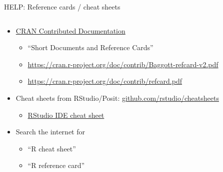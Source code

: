 \documentclass[
  11pt,
  ignorenonframetext,
]{beamer}
\providecommand{\tightlist}{%
  \setlength{\itemsep}{0pt}\setlength{\parskip}{0pt}}
\begin{document}
\begin{frame}{HELP: Reference cards / cheat sheets}
\protect\hypertarget{help-reference-cards-cheat-sheets}{}
\begin{columns}[c,onlytextwidth]
\begin{column}{0.55\textwidth}
\begin{itemize}
\item
  \href{https://cran.r-project.org/other-docs.html}{CRAN Contributed
  Documentation}

  \begin{itemize}
  \item
    ``Short Documents and Reference Cards''
  \item
    \url{https://cran.r-project.org/doc/contrib/Baggott-refcard-v2.pdf}
  \item
    \url{https://cran.r-project.org/doc/contrib/refcard.pdf}
  \end{itemize}
\item
  Cheat sheets from RStudio/Posit:
  \href{https://github.com/rstudio/cheatsheets}{github.com/rstudio/cheatsheets}

  \begin{itemize}
  \tightlist
  \item
    \href{https://raw.githubusercontent.com/rstudio/cheatsheets/main/rstudio-ide.pdf}{RStudio
    IDE cheat sheet}
  \end{itemize}
\item
  Search the internet for

  \begin{itemize}
  \tightlist
  \item
    ``R cheat sheet''
  \item
    ``R reference card''
  \end{itemize}
\end{itemize}
\end{column}


\end{columns}
\end{frame}
\end{document}
